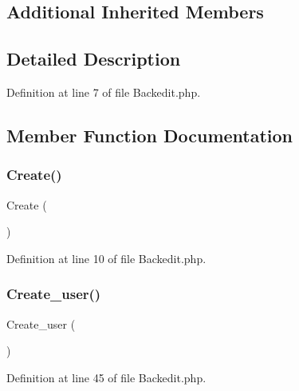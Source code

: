 \subsection*{Additional Inherited Members}


\subsection{Detailed Description}


Definition at line 7 of file Backedit.\+php.



\subsection{Member Function Documentation}
\mbox{\label{class_src_1_1_controllers_1_1_backedit_ad01f71fa0ecc039494e3c282864298c3}} 
\subsubsection{Create()}
{\footnotesize\ttfamily Create (\begin{DoxyParamCaption}{ }\end{DoxyParamCaption})}



Definition at line 10 of file Backedit.\+php.

\mbox{\label{class_src_1_1_controllers_1_1_backedit_af3369c06390987c5f54b6bc444c615ee}} 
\subsubsection{Create\+\_\+user()}
{\footnotesize\ttfamily Create\+\_\+user (\begin{DoxyParamCaption}{ }\end{DoxyParamCaption})}



Definition at line 45 of file Backedit.\+php.

\mbox{\label{class_src_1_1_controllers_1_1_backedit_a59113b5ecd1d155db6a4f30af34a1e80}} 
